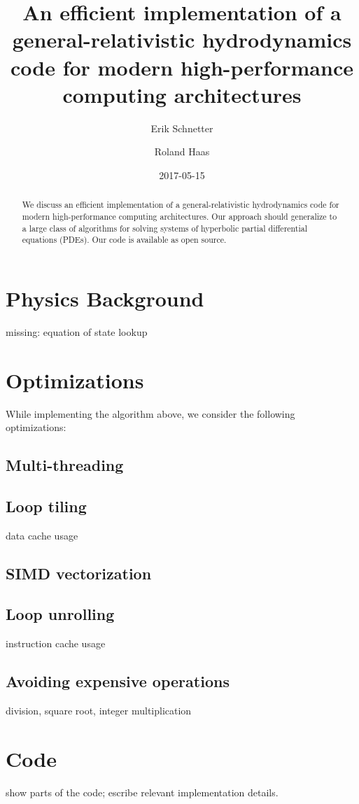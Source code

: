 \documentclass[superscriptaddress, twocolumn]{revtex4}
\begin{document}
\title{An efficient implementation of a general-relativistic
  hydrodynamics code for modern high-performance computing
  architectures}
\author{Erik Schnetter}
\author{Roland Haas}
\date{2017-05-15}
\begin{abstract}
  We discuss an efficient implementation of a general-relativistic
  hydrodynamics code for modern high-performance computing
  architectures. Our approach should generalize to a large class of
  algorithms for solving systems of hyperbolic partial differential
  equations (PDEs). Our code is available as open source.
\end{abstract}
\maketitle

\section{Physics Background}
missing: equation of state lookup

\section{Optimizations}
While implementing the algorithm above, we consider the following
optimizations:
\subsection{Multi-threading}
\subsection{Loop tiling}
data cache usage
\subsection{SIMD vectorization}
\subsection{Loop unrolling}
instruction cache usage
\subsection{Avoiding expensive operations}
division, square root, integer multiplication

\section{Code}
show parts of the code; escribe relevant implementation details.
\end{document}
